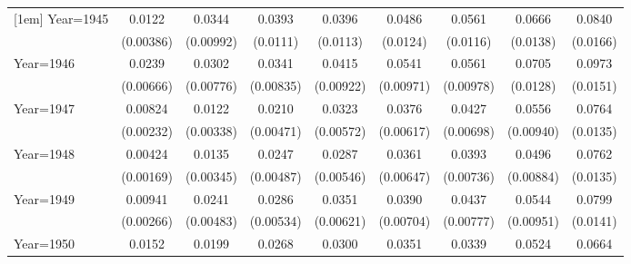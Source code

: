 \begin{table}[htbp]
\begin{tabular}{l*{8}{c}}
[1em]
Year=1945           &      0.0122\sym{***}&      0.0344\sym{***}&      0.0393\sym{***}&      0.0396\sym{***}&      0.0486\sym{***}&      0.0561\sym{***}&      0.0666\sym{***}&      0.0840\sym{***}\\
                    &   (0.00386)         &   (0.00992)         &    (0.0111)         &    (0.0113)         &    (0.0124)         &    (0.0116)         &    (0.0138)         &    (0.0166)         \\
[1em]
Year=1946           &      0.0239\sym{***}&      0.0302\sym{***}&      0.0341\sym{***}&      0.0415\sym{***}&      0.0541\sym{***}&      0.0561\sym{***}&      0.0705\sym{***}&      0.0973\sym{***}\\
                    &   (0.00666)         &   (0.00776)         &   (0.00835)         &   (0.00922)         &   (0.00971)         &   (0.00978)         &    (0.0128)         &    (0.0151)         \\
[1em]
Year=1947           &     0.00824\sym{***}&      0.0122\sym{***}&      0.0210\sym{***}&      0.0323\sym{***}&      0.0376\sym{***}&      0.0427\sym{***}&      0.0556\sym{***}&      0.0764\sym{***}\\
                    &   (0.00232)         &   (0.00338)         &   (0.00471)         &   (0.00572)         &   (0.00617)         &   (0.00698)         &   (0.00940)         &    (0.0135)         \\
[1em]
Year=1948           &     0.00424\sym{**} &      0.0135\sym{***}&      0.0247\sym{***}&      0.0287\sym{***}&      0.0361\sym{***}&      0.0393\sym{***}&      0.0496\sym{***}&      0.0762\sym{***}\\
                    &   (0.00169)         &   (0.00345)         &   (0.00487)         &   (0.00546)         &   (0.00647)         &   (0.00736)         &   (0.00884)         &    (0.0135)         \\
[1em]
Year=1949           &     0.00941\sym{***}&      0.0241\sym{***}&      0.0286\sym{***}&      0.0351\sym{***}&      0.0390\sym{***}&      0.0437\sym{***}&      0.0544\sym{***}&      0.0799\sym{***}\\
                    &   (0.00266)         &   (0.00483)         &   (0.00534)         &   (0.00621)         &   (0.00704)         &   (0.00777)         &   (0.00951)         &    (0.0141)         \\
[1em]
Year=1950           &      0.0152\sym{***}&      0.0199\sym{***}&      0.0268\sym{***}&      0.0300\sym{***}&      0.0351\sym{***}&      0.0339\sym{***}&      0.0524\sym{***}&      0.0664\sym{***}\\

\end{tabular}
\end{table}
